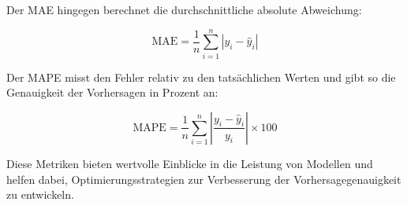 Der MAE hingegen berechnet die durchschnittliche absolute Abweichung:

\begin{equation}
	\text{MAE} = \frac{1}{n} \sum_{i=1}^{n} |y_i - \hat{y}_i|
\end{equation}

Der MAPE misst den Fehler relativ zu den tatsächlichen Werten und gibt so die Genauigkeit der Vorhersagen in Prozent an:

\begin{equation}
	\text{MAPE} = \frac{1}{n} \sum_{i=1}^{n} \left| \frac{y_i - \hat{y}_i}{y_i} \right| \times 100
\end{equation}

Diese Metriken bieten wertvolle Einblicke in die Leistung von Modellen und helfen dabei, Optimierungsstrategien zur Verbesserung der Vorhersagegenauigkeit zu entwickeln.

\autocite{davydenko2009mean}
\autocite{hyndman2006another}
\autocite{makridakis1993accuracy}




